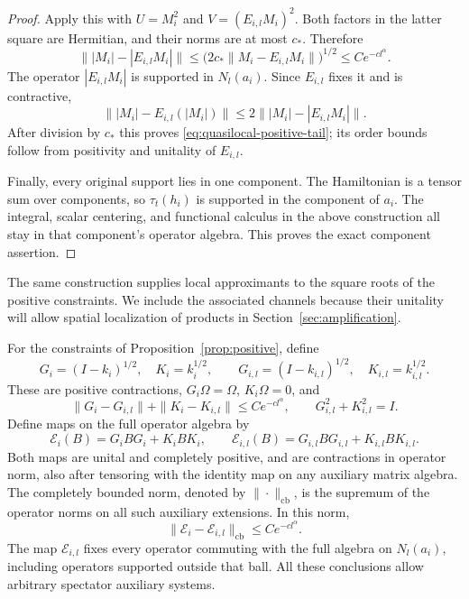 \begin{proof}
Apply this with $U=M_i^2$ and $V=(E_{i,l}M_i)^2$.  Both factors in the
latter square are Hermitian, and their norms are at most $c_*$.  Therefore
\[
 \big\||M_i|-|E_{i,l}M_i|\big\|
 \le\bigl(2c_*\|M_i-E_{i,l}M_i\|\bigr)^{1/2}
 \le Ce^{-cl^\alpha}.
\]
The operator $|E_{i,l}M_i|$ is supported in $N_l(a_i)$.  Since $E_{i,l}$
fixes it and is contractive,
\[
 \||M_i|-E_{i,l}(|M_i|)\|
       \le2\big\||M_i|-|E_{i,l}M_i|\big\|.
\]
After division by $c_*$ this proves
\eqref{eq:quasilocal-positive-tail}; its order bounds follow from
positivity and unitality of $E_{i,l}$.

Finally, every original support lies in one component.  The Hamiltonian
is a tensor sum over components, so $\tau_t(h_i)$ is supported in the
component of $a_i$.  The integral, scalar centering, and functional calculus
in the above construction all stay in that component's operator algebra.
This proves the exact component assertion.
\end{proof}

The same construction supplies local approximants to the square roots of
the positive constraints.  We include the associated channels because
their unitality will allow spatial localization of products in
Section~\ref{sec:amplification}.

\begin{lemma}
\label{lem:quasilocal-roots}
For the constraints of Proposition~\ref{prop:positive}, define
\[
 G_i=(I-k_i)^{1/2},\quad K_i=k_i^{1/2},\qquad
 G_{i,l}=(I-k_{i,l})^{1/2},\quad K_{i,l}=k_{i,l}^{1/2}.
\]
These are positive contractions, $G_i\Omega=\Omega$, $K_i\Omega=0$,
and
\begin{equation}
 \|G_i-G_{i,l}\|+\|K_i-K_{i,l}\|\le Ce^{-cl^\alpha},
 \qquad G_{i,l}^2+K_{i,l}^2=I.
 \label{eq:quasilocal-root-tail}
\end{equation}
Define maps on the full operator algebra by
\[
 \mathcal E_i(B)=G_iBG_i+K_iBK_i,\qquad
 \mathcal E_{i,l}(B)=G_{i,l}BG_{i,l}+K_{i,l}BK_{i,l}.
\]
Both maps are unital and completely positive, and are contractions in
operator norm, also after tensoring with the identity map on any auxiliary
matrix algebra.  The completely bounded norm, denoted by
$\|\cdot\|_{\mathrm{cb}}$, is the supremum of the operator norms on all
such auxiliary extensions.  In this norm,
\begin{equation}
 \|\mathcal E_i-\mathcal E_{i,l}\|_{\mathrm{cb}}
          \le Ce^{-cl^\alpha}.
 \label{eq:quasilocal-channel-tail}
\end{equation}
The map $\mathcal E_{i,l}$ fixes every operator commuting with the full
algebra on $N_l(a_i)$, including operators supported outside that ball.
All these conclusions allow arbitrary spectator auxiliary systems.
\end{lemma}

